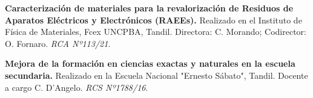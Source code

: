\textbf{Caracterización de materiales para la revalorización de Residuos de Aparatos Eléctricos y Electrónicos (RAEEs).} Realizado en el Instituto de Física de Materiales, Fcex UNCPBA, Tandil. Directora: C. Morando; Codirector: O. Fornaro. \textit{RCA Nº113/21}.

\textbf{Mejora de la formación en ciencias exactas y naturales en la escuela secundaria.} Realizado en la Escuela Nacional "Ernesto Sábato", Tandil. Docente a cargo C. D'Angelo. \textit{RCS Nº1788/16}.